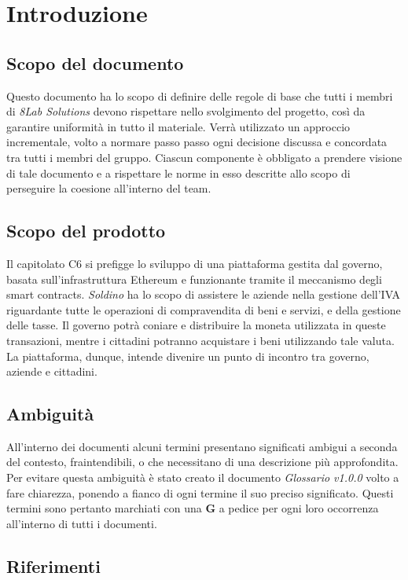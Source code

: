 \section{Introduzione}
\subsection{Scopo del documento}
Questo documento ha lo scopo di definire delle regole di base che tutti i membri 
di \textit{8Lab Solutions} devono rispettare nello svolgimento del progetto, 
così da garantire uniformità in tutto il materiale. Verrà utilizzato un 
approccio incrementale, volto a normare passo passo ogni decisione discussa e 
concordata tra tutti i membri del gruppo. Ciascun componente è obbligato a 
prendere visione di tale documento e a rispettare le norme in esso descritte 
allo scopo di perseguire la coesione all'interno del team.

\subsection{Scopo del prodotto}
Il capitolato C6 si prefigge lo sviluppo di una piattaforma gestita dal governo, 
basata sull'infrastruttura Ethereum\glo{} e funzionante tramite il meccanismo 
degli smart contracts\glo{}. \textit{Soldino} ha lo scopo di assistere le 
aziende nella gestione dell'IVA riguardante tutte le operazioni di compravendita 
di beni e servizi, e della gestione delle tasse. Il governo potrà coniare e 
distribuire la moneta utilizzata in queste transazioni, mentre i cittadini 
potranno acquistare i beni utilizzando tale valuta. La piattaforma, dunque, 
intende divenire un punto di incontro tra governo, aziende e cittadini.

\subsection{Ambiguità}
All'interno dei documenti alcuni termini presentano significati ambigui  a  
seconda del contesto, fraintendibili, o che necessitano di una descrizione più 
approfondita. Per evitare questa ambiguità è stato creato il documento 
\textit{Glossario v1.0.0} volto a fare chiarezza, ponendo a fianco di ogni 
termine il suo preciso significato. Questi termini sono pertanto marchiati con 
una \textbf{G} a pedice per ogni loro occorrenza all'interno di tutti i 
documenti.

\subsection{Riferimenti}
